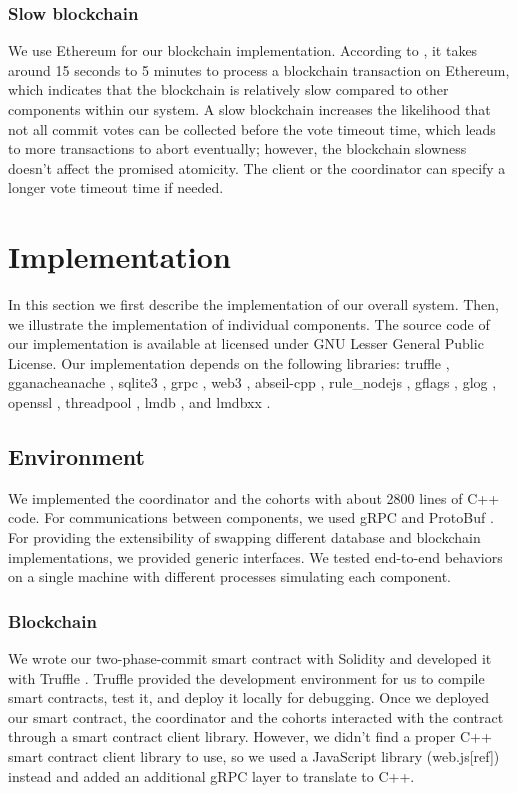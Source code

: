 \documentclass[11pt,conference]{IEEEtran}
\begin{document}
\subsubsection{Slow blockchain}
We use Ethereum for our blockchain implementation. According to \cite{stationlong}, it takes around 15 seconds to 5 minutes to process a blockchain transaction on Ethereum, which indicates that the blockchain is relatively slow compared to other components within our system. A slow blockchain increases the likelihood that not all commit votes can be collected before the vote timeout time, which leads to more transactions to abort eventually; however, the blockchain slowness doesn’t affect the promised atomicity. The client or the coordinator can specify a longer vote timeout time if needed.

\section{Implementation}
In this section we first describe the implementation of our overall system. Then, we illustrate the implementation of individual components. The source code of our implementation is available at licensed under GNU Lesser General Public License. Our implementation depends on the following libraries: truffle \cite{github_truffle}, gganacheanache \cite{github_ganache}, sqlite3 \cite{github_sqlite3}, grpc \cite{github_grpc}, web3 \cite{github_web3}, abseil-cpp \cite{github_absl}, rule\_nodejs \cite{github_rulejs}, gflags \cite{github_gflags}, glog \cite{github_glog}, openssl \cite{github_openssl}, threadpool \cite{Shoshany2021_ThreadPool}, lmdb \cite{github_lmdb}, and lmdbxx \cite{github_lmdbxx}.

\subsection{Environment}
We implemented the coordinator and the cohorts with about 2800 lines of C++ code. For communications between components, we used gRPC \cite{github_grpc} and ProtoBuf \cite{github_proto}. For providing the extensibility of swapping different database and blockchain implementations, we provided generic interfaces. We tested end-to-end behaviors on a single machine with different processes simulating each component.

\subsubsection{Blockchain}
We wrote our two-phase-commit smart contract with Solidity and developed it with Truffle \cite{github_truffle}. Truffle provided the development environment for us to compile smart contracts, test it, and deploy it locally for debugging. Once we deployed our smart contract, the coordinator and the cohorts interacted with the contract through a smart contract client library. However, we didn’t find a proper C++ smart contract client library to use, so we used a JavaScript library (web.js[ref]) instead and added an additional gRPC layer to translate to C++.
\end{document}
